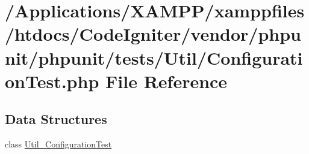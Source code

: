 \hypertarget{_configuration_test_8php}{}\section{/\+Applications/\+X\+A\+M\+P\+P/xamppfiles/htdocs/\+Code\+Igniter/vendor/phpunit/phpunit/tests/\+Util/\+Configuration\+Test.php File Reference}
\label{_configuration_test_8php}
\subsection*{Data Structures}
\begin{DoxyCompactItemize}
\item 
class \mbox{\hyperlink{class_util___configuration_test}{Util\+\_\+\+Configuration\+Test}}
\end{DoxyCompactItemize}
